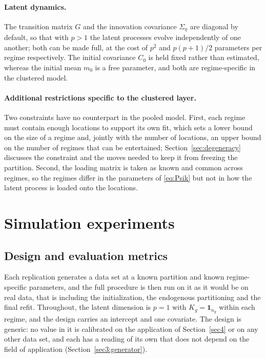 \paragraph{Latent dynamics.} The transition matrix $G$ and the innovation covariance $\Sigma_\eta$ are diagonal by default, so that with $p > 1$ the latent processes evolve independently of one another; both can be made full, at the cost of $p^2$ and $p(p+1)/2$ parameters per regime respectively. The initial covariance $C_0$ is held fixed rather than estimated, whereas the initial mean $m_0$ is a free parameter, and both are regime-specific in the clustered model.

\paragraph{Additional restrictions specific to the clustered layer.} Two constraints have no counterpart in the pooled model. First, each regime must contain enough locations to support its own fit, which sets a lower bound on the size of a regime and, jointly with the number of locations, an upper bound on the number of regimes that can be entertained; Section~\ref{sec:degeneracy} discusses the constraint and the moves needed to keep it from freezing the partition. Second, the loading matrix is taken as known and common across regimes, so the regimes differ in the parameters of \eqref{eq:Psik} but not in how the latent process is loaded onto the locations.

\section{Simulation experiments}\label{sec3}

\subsection{Design and evaluation metrics}\label{sec3:design}

Each replication generates a data set at a known partition and known regime-specific parameters, and the full procedure is then run on it as it would be on real data, that is including the initialization, the endogenous partitioning and the final refit. Throughout, the latent dimension is $p=1$ with $K_g = \mathbf{1}_{n_g}$ within each regime, and the design carries an intercept and one covariate. The design is generic: no value in it is calibrated on the application of Section~\ref{sec4} or on any other data set, and each has a reading of its own that does not depend on the field of application (Section~\ref{sec3:generator}).

